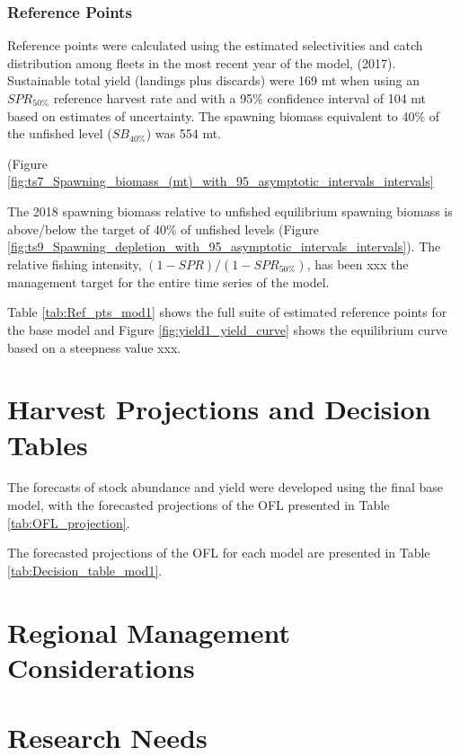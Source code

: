 \documentclass[12pt,]{article}
\begin{document}
\subsubsection{Reference Points}\label{reference-points-1}

Reference points were calculated using the estimated selectivities and
catch distribution among fleets in the most recent year of the model,
(2017). Sustainable total yield (landings plus discards) were 169 mt
when using an \(SPR_{50\%}\) reference harvest rate and with a 95\%
confidence interval of 104 mt based on estimates of uncertainty. The
spawning biomass equivalent to 40\% of the unfished level
(\(SB_{40\%}\)) was 554 mt.

(Figure
\ref{fig:ts7_Spawning_biomass_(mt)_with_95_asymptotic_intervals_intervals}

The 2018 spawning biomass relative to unfished equilibrium spawning
biomass is above/below the target of 40\% of unfished levels (Figure
\ref{fig:ts9_Spawning_depletion_with_95_asymptotic_intervals_intervals}).
The relative fishing intensity, \((1-SPR)/(1-SPR_{50\%})\), has been xxx
the management target for the entire time series of the model.

Table \ref{tab:Ref_pts_mod1} shows the full suite of estimated reference
points for the base model and Figure \ref{fig:yield1_yield_curve} shows
the equilibrium curve based on a steepness value xxx.

\section{Harvest Projections and Decision
Tables}\label{harvest-projections-and-decision-tables}

The forecasts of stock abundance and yield were developed using the
final base model, with the forecasted projections of the OFL presented
in Table \ref{tab:OFL_projection}.

The forecasted projections of the OFL for each model are presented in
Table \ref{tab:Decision_table_mod1}.

\section{Regional Management
Considerations}\label{regional-management-considerations}

\section{Research Needs}\label{research-needs}
\end{document}
